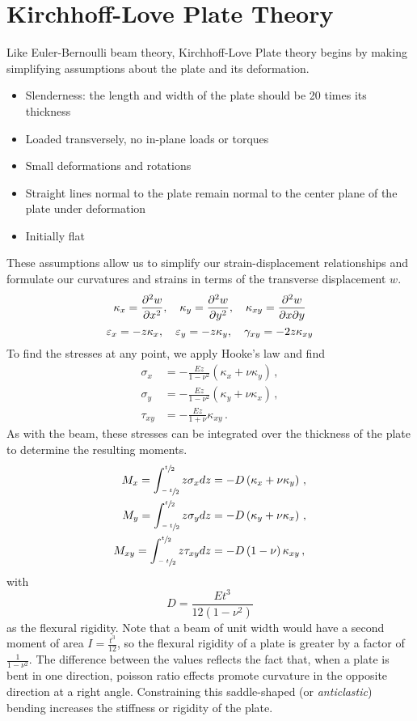 \section{Kirchhoff-Love Plate Theory}
Like Euler-Bernoulli beam theory, Kirchhoff-Love Plate theory begins by making simplifying assumptions about the plate and its deformation.
\begin{itemize}
 \item Slenderness: the length and width of the plate should be 20 times its thickness
 \item Loaded transversely, no in-plane loads or torques
 \item Small deformations and rotations
 \item Straight lines normal to the plate remain normal to the center plane of the plate under deformation
 \item Initially flat
\end{itemize}
These assumptions allow us to simplify our strain-displacement relationships and formulate our curvatures and strains in terms of the transverse displacement $w$.
\begin{equation}
    \kappa_x=\frac{\partial^2 w}{\partial x^2}, \quad \kappa_y= \frac{\partial^2 w}{\partial y^2}, \quad \kappa_{xy}=\frac{\partial^2 w}{\partial x\partial y}\notag
\end{equation}
\begin{equation}
\varepsilon_x = -z \kappa_x, \quad \varepsilon_y = -z \kappa_y, \quad \gamma_{xy} = -2 z \kappa_{xy} \notag
\end{equation}
To find the stresses at any point, we apply Hooke's law and find
\begin{align*}
\sigma_x &= -\frac{E z}{1-\nu^2}\left(\kappa_x+\nu\kappa_y\right)\, ,\\
\sigma_y &= -\frac{E z}{1-\nu^2}\left(\kappa_y+\nu\kappa_x\right)\, ,\\
\tau_{xy} &= -\frac{Ez}{1+\nu}\kappa_{xy}\, .
\end{align*}
As with the beam, these stresses can be integrated over the thickness of the plate to determine the resulting moments.
\begin{align*}
M_x = \int_{\sfrac{-t}{2}}^{\sfrac{t}{2}}z\sigma_x dz &=-D\left(\kappa_x+\nu\kappa_y\right)\, ,\\
M_y = \int_{\sfrac{-t}{2}}^{\sfrac{t}{2}}z\sigma_y dz &=-D\left(\kappa_y+\nu\kappa_x\right)\, ,\\
M_{xy} = \int_{\sfrac{-t}{2}}^{\sfrac{t}{2}}z\tau_{xy}dz &= -D\left(1-\nu\right)\kappa_{xy}\, ,
\end{align*}
with
\begin{equation*}
D=\frac{Et^3}{12\left(1-\nu^2\right)}
\end{equation*}
as the flexural rigidity.
Note that a beam of unit width would have a second moment of area $I = \frac{t^3}{12}$, so the flexural rigidity of a plate is greater by a factor of $\frac{1}{1-\nu^2}$.
The difference between the values reflects the fact that, when a plate is bent in one direction, poisson ratio effects promote curvature in the opposite direction at a right angle.
Constraining this saddle-shaped (or \textit{anticlastic}) bending increases the stiffness or rigidity of the plate.

